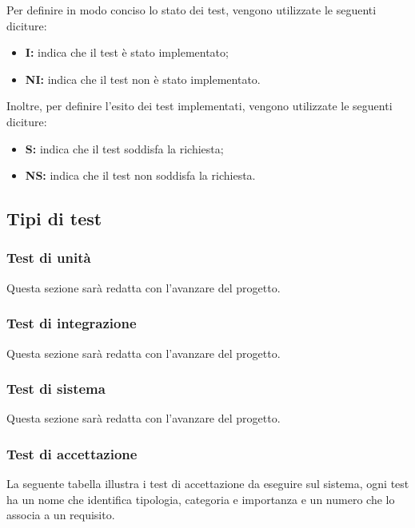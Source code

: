 Per definire in modo conciso lo stato dei test, vengono utilizzate le seguenti diciture:
\begin{itemize}
    \item \textbf{I:} indica che il test è stato implementato;
    \item \textbf{NI:} indica che il test non è stato implementato.
\end{itemize}
Inoltre, per definire l'esito dei test implementati, vengono utilizzate le seguenti diciture:
\begin{itemize}
    \item \textbf{S:} indica che il test soddisfa la richiesta;
    \item \textbf{NS:} indica che il test non soddisfa la richiesta.
\end{itemize}
\subsection{Tipi di test}
\subsubsection{Test di unità}
Questa sezione sarà redatta con l'avanzare del progetto.
\subsubsection{Test di integrazione}
Questa sezione sarà redatta con l'avanzare del progetto.
\subsubsection{Test di sistema}
Questa sezione sarà redatta con l'avanzare del progetto.
\subsubsection{Test di accettazione}
La seguente tabella illustra i test di accettazione da eseguire sul sistema, ogni test ha un nome che identifica tipologia, categoria e importanza e un numero che lo associa a un requisito.

